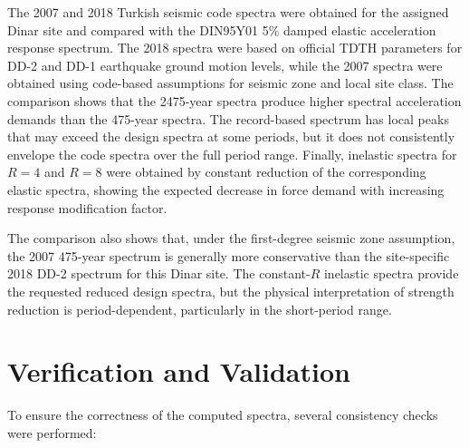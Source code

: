 ﻿\documentclass[12pt]{article}
\begin{document}
The 2007 and 2018 Turkish seismic code spectra were obtained for the assigned Dinar site and compared with the DIN95Y01 5\% damped elastic acceleration response spectrum. The 2018 spectra were based on official TDTH parameters for DD-2 and DD-1 earthquake ground motion levels, while the 2007 spectra were obtained using code-based assumptions for seismic zone and local site class. The comparison shows that the 2475-year spectra produce higher spectral acceleration demands than the 475-year spectra. The record-based spectrum has local peaks that may exceed the design spectra at some periods, but it does not consistently envelope the code spectra over the full period range. Finally, inelastic spectra for $R=4$ and $R=8$ were obtained by constant reduction of the corresponding elastic spectra, showing the expected decrease in force demand with increasing response modification factor.

The comparison also shows that, under the first-degree seismic zone assumption, the 2007 475-year spectrum is generally more conservative than the site-specific 2018 DD-2 spectrum for this Dinar site. The constant-$R$ inelastic spectra provide the requested reduced design spectra, but the physical interpretation of strength reduction is period-dependent, particularly in the short-period range.

\section{Verification and Validation}

To ensure the correctness of the computed spectra, several consistency checks were performed:
\end{document}
